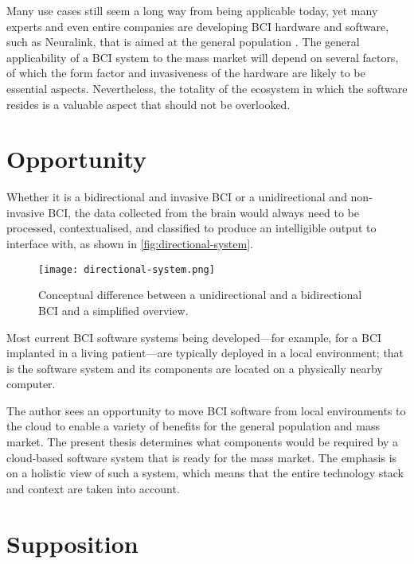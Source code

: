 Many use cases still seem a long way from being applicable today, yet many experts and even entire companies are developing BCI hardware and software, such as Neuralink, that is aimed at the general population \citep{urban_neuralink_2017}. The general applicability of a BCI system to the mass market will depend on several factors, of which the form factor and invasiveness of the hardware are likely to be essential aspects. Nevertheless, the totality of the ecosystem in which the software resides is a valuable aspect that should not be overlooked.

\section{Opportunity}
\label{chapter1-opportunity}

Whether it is a bidirectional and invasive BCI or a unidirectional and non-invasive BCI, the data collected from the brain would always need to be processed, contextualised, and classified to produce an intelligible output to interface with, as shown in \autoref{fig:directional-system}.

\begin{figure}[ht]
  \centering
  \texttt{[image: directional-system.png]}
  \caption{Conceptual difference between a unidirectional and a bidirectional BCI and a simplified overview.}
  \label{fig:directional-system}
\end{figure}

Most current BCI software systems being developed—for example, for a BCI implanted in a living patient—are typically deployed in a local environment; that is the software system and its components are located on a physically nearby computer.

The author sees an opportunity to move BCI software from local environments to the cloud to enable a variety of benefits for the general population and mass market. The present thesis determines what components would be required by a cloud-based software system that is ready for the mass market. The emphasis is on a holistic view of such a system, which means that the entire technology stack and context are taken into account.

\section{Supposition}
\label{chapter1-supposition}

